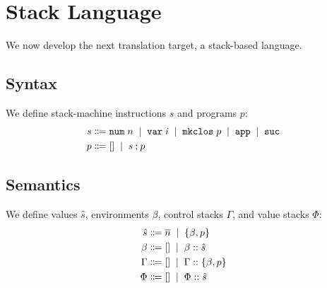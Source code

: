 \documentclass[12pt]{article}
\newcommand{\tup}[1]{\langle #1 \rangle}
\newcommand{\alt}{\;\; | \;\;}
\newcommand{\defi}{\Coloneqq}
\newcommand{\nil}{[]}
\newcommand{\h}[1]{\hat{#1}}
\newcommand{\n}[1]{\overline{#1}}
\newcommand{\cl}[2]{\{ #1 , #2 \}}
\newcommand{\sapp}{\mathtt{app}}
\newcommand{\sev}[4]{\ensuremath{\langle #1; #2 \rangle \rightarrow \langle #3; #4 \rangle}}
\newcommand{\sevv}[3]{\ensuremath{#1 \vdash #2 \downarrow^{\mathrm{v}} #3}}
\newcommand{\e}{e} %
\renewcommand{\b}{b} %
\renewcommand{\h}{h}
\newcommand{\snum}{\mathtt{num} \;}
\newcommand{\svar}{\mathtt{var} \;}
\newcommand{\slam}{\mathtt{mkclos} \;}
\renewcommand{\sapp}{\mathtt{app}}
\renewcommand{\b}{\beta}
\begin{document}
\renewcommand{\tup}[1]{\langle #1 \rangle}%

\renewcommand{\h}{\hat}%




\section*{Stack Language}

\renewcommand{\snum}[1]{\mathtt{num} \; #1}%
\renewcommand{\svar}[1]{\mathtt{var} \; #1}%
\renewcommand{\slam}[1]{\mathtt{mkclos} \; #1}%
\renewcommand{\sapp}{\mathtt{app}}%
\newcommand{\ssuc}{\mathtt{suc}}


\renewcommand{\b}{\beta}
\newcommand{\G}{\Gamma}
\newcommand{\Ph}{\Phi}
\newcommand{\Ps}{\Psi}

\newcommand{\hs}{\hat{s}}


\renewcommand{\sev}[2]{\ensuremath{#1 \downarrow #2}}%
\newcommand{\sstep}[4]{\ensuremath{\tup{#1, #2} \rightarrow \tup{#3, #4}}}
\newcommand{\ssteps}[4]{\ensuremath{\tup{#1, #2} \rightarrow^* \tup{#3, #4}}}
\renewcommand{\sevv}[3]{\ensuremath{#1 \vdash #2 \uparrow #3}}%


We now develop the next translation target, a stack-based language.

\subsection*{Syntax}

We define stack-machine instructions $s$ and programs $p$:
\begin{align*}
  s &\defi \snum{n} \alt \svar{i} \alt \slam{p} \alt \sapp \alt \ssuc \\
  p &\defi \nil \alt s \seq p
\end{align*}

\subsection*{Semantics}

We define values $\h{s}$, environments $\b$, control stacks $\G$, and value stacks $\Ph$:
\begin{align*}
  \hs &\defi \n{n} \alt \cl{\b}{p} \\
  \b &\defi \nil \alt \b \cons \hs \\
  \G &\defi \nil \alt \G \cons \cl{\b}{p} \\
  \Ph &\defi \nil \alt \Ph \cons \hs \\
\end{align*}
\end{document}
